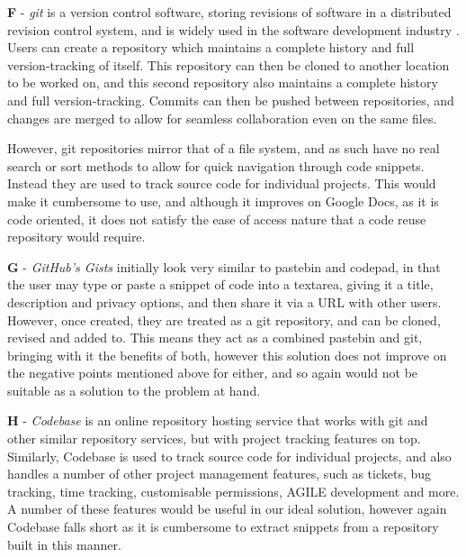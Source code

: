 \textbf{F} - \textit{git} is a version control software, storing revisions of software in a distributed revision control system, and is widely used in the software development industry \cite{Skerrett2014}.
Users can create a repository which maintains a complete history and full version-tracking of itself.
This repository can then be cloned to another location to be worked on, and this second repository also maintains a complete history and full version-tracking.
Commits can then be pushed between repositories, and changes are merged to allow for seamless collaboration even on the same files.

However, git repositories mirror that of a file system, and as such have no real search or sort methods to allow for quick navigation through code snippets.
Instead they are used to track source code for individual projects.
This would make it cumbersome to use, and although it improves on Google Docs, as it is code oriented, it does not satisfy the ease of access nature that a code reuse repository would require.

\textbf{G} - \textit{GitHub's Gists} initially look very similar to pastebin and codepad, in that the user may type or paste a snippet of code into a textarea, giving it a title, description and privacy options, and then share it via a URL with other users.
However, once created, they are treated as a git repository, and can be cloned, revised and added to.
This means they act as a combined pastebin and git, bringing with it the benefits of both, however this solution does not improve on the negative points mentioned above for either, and so again would not be suitable as a solution to the problem at hand.

\textbf{H} - \textit{Codebase} is an online repository hosting service that works with git and other similar repository services, but with project tracking features on top.
Similarly, Codebase is used to track source code for individual projects, and also handles a number of other project management features, such as tickets, bug tracking, time tracking, customisable permissions, AGILE development and more.
A number of these features would be useful in our ideal solution, however again Codebase falls short as it is cumbersome to extract snippets from a repository built in this manner.

